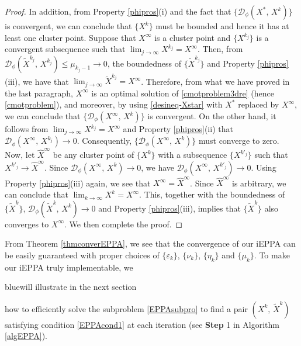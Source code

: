 \documentclass[10pt]{article}
\newcommand{\blue}[1]{\begin{color}{blue}#1\end{color}}
\begin{document}
\begin{proof}
In addition, from Property \ref{phipros}(i) and the fact that $\{\mathcal{D}_{\phi}(X^*,\,X^k)\}$ is convergent, we can conclude that $\{X^k\}$ must be bounded and hence it has at least one cluster point. Suppose that $X^{\infty}$ is a cluster point and $\{X^{k_j}\}$ is a convergent subsequence such that $\lim_{j\to\infty} X^{k_j} = X^{\infty}$. Then, from $\mathcal{D}_{\phi}(\widetilde{X}^{k_j}, \,X^{k_j})\leq\mu_{k_j-1}\to0$, the boundedness of $\{\widetilde{X}^{k_j}\}$ and Property \ref{phipros}(iii), we have that $\lim_{j\to\infty}\widetilde{X}^{k_j}= X^{\infty}$. Therefore, from what we have proved in the last paragraph, $X^{\infty}$ is an optimal solution of \eqref{cmotproblem3dre} (hence \eqref{cmotproblem}), and moreover, by using \eqref{desineq-Xstar} with $X^*$ replaced by $X^{\infty}$, we can conclude that $\{\mathcal{D}_{\phi}(X^{\infty},\,X^k)\}$ is convergent. On the other hand, it follows from $\lim_{j\to\infty} X^{k_j} = X^{\infty}$ and Property \ref{phipros}(ii) that $\mathcal{D}_{\phi}(X^{\infty}, \,X^{k_j})\to0$. Consequently, $\{\mathcal{D}_{\phi}(X^{\infty},\,X^k)\}$ must converge to zero. Now, let $\widehat{X}^{\infty}$ be any cluster point of $\{X^k\}$ with a subsequence $\{X^{k'_j}\}$ such that $X^{k'_j}\to\widehat{X}^{\infty}$. Since $\mathcal{D}_{\phi}(X^{\infty},\,X^k)\to0$, we have $\mathcal{D}_{\phi}(X^{\infty},\,X^{k'_j})\to0$. Using Property \ref{phipros}(iii) again, we see that $X^{\infty}=\widehat{X}^{\infty}$. Since $\widehat{X}^{\infty}$ is arbitrary, we can conclude that $\lim_{k\to\infty}X^k=X^{\infty}$. This, together with the boundedness of $\{\widetilde{X}^k\}$, $\mathcal{D}_{\phi}(\widetilde{X}^{k}, \,X^{k})\to0$ and Property \ref{phipros}(iii), implies that $\{\widetilde{X}^k\}$ also converges to $X^{\infty}$. We then complete the proof.
\end{proof}



From Theorem \ref{thmconverEPPA}, we see that the convergence of our iEPPA can be easily guaranteed with proper choices of $\{\varepsilon_k\}$, $\{\nu_k\}$, $\{\eta_k\}$ and $\{\mu_k\}$. To make our iEPPA truly implementable, we \blue{will illustrate in the next section} how to efficiently solve the subproblem \eqref{EPPAsubpro} to find a pair $(X^{k},\,\widetilde{X}^{k})$ satisfying condition \eqref{EPPAcond1} at each iteration (see {\bf Step} 1 in Algorithm \ref{algEPPA}).
\end{document}
